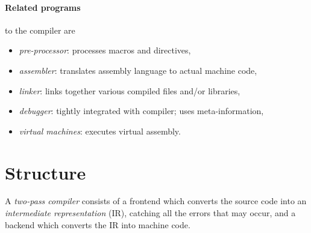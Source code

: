\documentclass{article}
\begin{document}
\paragraph{Related programs} to the compiler are 
\begin{itemize}
    \item \emph{pre-processor}: processes macros and directives,
    \item \emph{assembler}: translates assembly language to actual machine code,
    \item \emph{linker}: links together various compiled files and/or libraries,
    \item \emph{debugger}: tightly integrated with compiler; uses meta-information,
    \item \emph{virtual machines}: executes virtual assembly.
\end{itemize}

\section{Structure}


\begin{definition}
    A \emph{two-pass compiler} consists of a frontend which converts the source code 
    into an \emph{intermediate representation} (IR), catching all the errors that may occur,
    and a backend which converts the IR into machine code.

    \begin{center}
    \end{center}
\end{definition}
\end{document}

